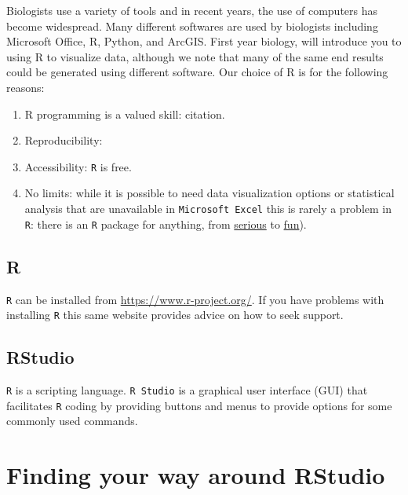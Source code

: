 \documentclass[]{book}
\begin{document}
Biologists use a variety of tools and in recent years, the use of computers has become widespread. Many different softwares are used by biologists including Microsoft Office, R, Python, and ArcGIS. First year biology, will introduce you to using R to visualize data, although we note that many of the same end results could be generated using different software. Our choice of R is for the following reasons:

\begin{enumerate}
\def\labelenumi{\arabic{enumi}.}
\item
  R programming is a valued skill: citation.
\item
  Reproducibility:
\item
  Accessibility: \texttt{R} is free.
\item
  No limits: while it is possible to need data visualization options or statistical analysis that are unavailable in \texttt{Microsoft\ Excel} this is rarely a problem in \texttt{R}: there is an \texttt{R} package for anything, from \href{https://rviews.rstudio.com/2017/10/09/population-modeling-in-r/}{serious} to \href{https://www.r-bloggers.com/useless-but-fun-r-packages/}{fun}).
\end{enumerate}

\hypertarget{r}{%
\section{R}\label{r}}

\texttt{R} can be installed from \url{https://www.r-project.org/}. If you have problems with installing \texttt{R} this same website provides advice on how to seek support.

\hypertarget{rstudio}{%
\section{RStudio}\label{rstudio}}

\texttt{R} is a scripting language. \texttt{R\ Studio} is a graphical user interface (GUI) that facilitates \texttt{R} coding by providing buttons and menus to provide options for some commonly used commands.

\hypertarget{finding-your-way-around-rstudio}{%
\chapter{Finding your way around RStudio}\label{finding-your-way-around-rstudio}}
\end{document}
